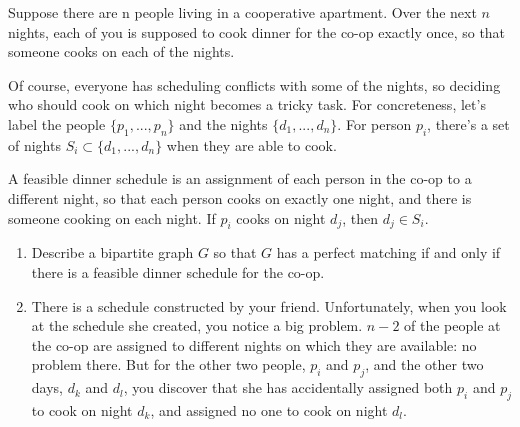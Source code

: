 \begin{exercise}[]{Suppose there are n people living in a cooperative apartment. Over the next $n$ nights, each of you is supposed to cook dinner for the co-op exactly once, so that someone cooks on each of the nights.

    Of course, everyone has scheduling conflicts with some of the nights, so deciding who should cook on which night becomes a tricky task. For concreteness, let's label the people $\{p_1, ..., p_n\}$ and the nights $\{d_1, ..., d_n\}$. For person $p_i$, there's a set of nights $S_i \subset \{d_1, ..., d_n\}$ when they are able to cook.
    
    A feasible dinner schedule is an assignment of each person in the co-op to a different night, so that each person cooks on exactly one night, and there is someone cooking on each night. If $p_i$ cooks on night $d_j$, then $d_j \in S_i$.
    
    \begin{enumerate}
        \item Describe a bipartite graph $G$ so that $G$ has a perfect matching if and only if there is a feasible dinner schedule for the co-op.
        \item There is a schedule constructed by your friend. Unfortunately, when you look at the schedule she created, you notice a big problem. $n-2$ of the people at the co-op are assigned to different nights on which they are available: no problem there. But for the other two people, $p_i$ and $p_j$, and the other two days, $d_k$ and $d_l$, you discover that she has accidentally assigned both $p_i$ and $p_j$ to cook on night $d_k$, and assigned no one to cook on night $d_l$.
        

\end{enumerate}}
\end{exercise}
